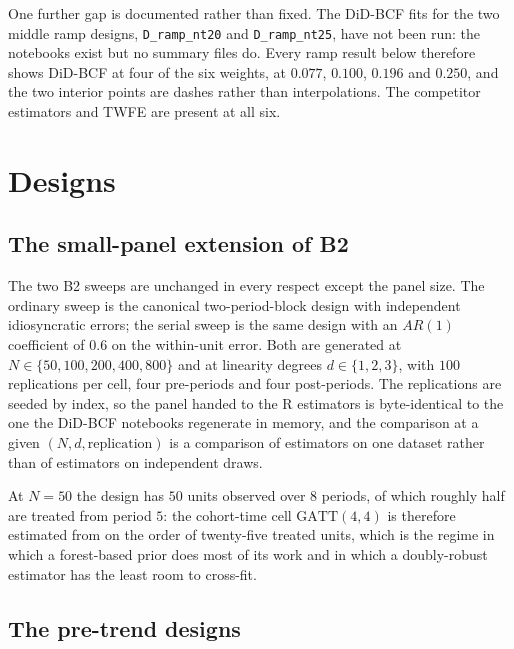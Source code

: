 \documentclass[11pt]{article}
\newcommand{\gatt}{\mathrm{GATT}}
\begin{document}
One further gap is documented rather than fixed. The DiD-BCF fits for the two
middle ramp designs, \texttt{D\_ramp\_nt20} and \texttt{D\_ramp\_nt25},
have not been run: the notebooks exist but no summary files do. Every ramp
result below therefore shows DiD-BCF at four of the six weights, at
$0.077$, $0.100$, $0.196$ and $0.250$, and the two interior points are dashes
rather than interpolations. The competitor estimators and TWFE are present at
all six.

\section{Designs}

\subsection{The small-panel extension of B2}

The two B2 sweeps are unchanged in every respect except the panel size. The
ordinary sweep is the canonical two-period-block design with independent
idiosyncratic errors; the serial sweep is the same design with an $AR(1)$
coefficient of $0.6$ on the within-unit error. Both are generated at
$N\in\{50,100,200,400,800\}$ and at linearity degrees $d\in\{1,2,3\}$, with
$100$ replications per cell, four pre-periods and four post-periods. The
replications are seeded by index, so the panel handed to the R estimators is
byte-identical to the one the DiD-BCF notebooks regenerate in memory, and the
comparison at a given $(N,d,\text{replication})$ is a comparison of estimators
on one dataset rather than of estimators on independent draws.

At $N=50$ the design has $50$ units observed over $8$ periods, of which
roughly half are treated from period $5$: the cohort-time cell
$\gatt(4,4)$ is therefore estimated from on the order of twenty-five treated
units, which is the regime in which a forest-based prior does most of its work
and in which a doubly-robust estimator has the least room to cross-fit.

\subsection{The pre-trend designs}
\end{document}
